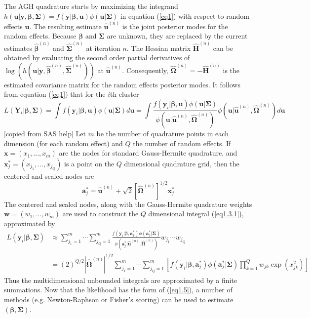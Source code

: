 	The AGH quadrature starts by maximizing the integrand $h(\bm u|\bm y, \bm \beta, \bm \Sigma)= f(\bm y|\bm \beta, \bm u)\phi(\bm u|\bm \Sigma)$ in equation (\ref{eq1}) with respect to random effects $\bm u$. The resulting estimate $\hat{\bm u}^{(n)}$ is the joint posterior modes for the random effects. Because $\bm \beta$ and $\bm \Sigma$ are unknown, they are replaced by the current estimates $\hat{\bm \beta}^{(n)}$ and $\hat{\bm \Sigma}^{(n)}$ at iteration $n$. The Hessian matrix $\hat{\bm H}^{(n)}$ can be obtained by evaluating the second order partial derivatives of $\log(h(\bm u|\bm y, \hat{\bm \beta}^{(n)}, \hat{\bm \Sigma}^{(n)}))$ at $\hat{\bm u}^{(n)}$.  Consequently, $\hat{\bm \Omega}^{(n)} =-\hat{\bm H}^{(n)} $ is the estimated covariance matrix for the random effects posterior modes. It follows from equation (\ref{eq1}) that for the $i$th cluster 
	\begin{equation}\label{eq1.3.1}
	L( \bm Y_i|\bm \beta, \bm \Sigma) = \int f(\bm y_i|\bm \beta, \bm u )\phi(\bm u|\bm\Sigma)d\bm u = 
	\int \frac{f(\bm y_i|\bm \beta, \bm u )\phi(\bm u|\bm\Sigma)}{\phi(\bm u|\hat{\bm u}^{(n)},\hat{\bm \Omega}^{(n)} )}\phi(\bm u|\hat{\bm u}^{(n)},\hat{\bm \Omega}^{(n)} )d\bm u
	\end{equation}
	[copied from SAS help] Let $m$ be the number of quadrature points in each dimension (for each random effect) and $Q$ the number of random effects. If $\bm x = (x_1, \ldots, x_m)$ are the nodes for standard Gauss-Hermite quadrature, and $\bm x^{\ast}_j=(x_{j_1}, \ldots, x_{j_Q}) $ is a point on the $Q$ dimensional quadrature grid, then the centered and scaled nodes are 
	\begin{equation}\label{1.3.2}
	\bm  a_j^{\ast} = \hat{\bm u}^{(n)} + \sqrt{2} [\hat{\bm \Omega}^{(n)} ]^{1/2}\bm x^{\ast}_j
	\end{equation}
	The centered and scaled nodes, along with the Gauss-Hermite quadrature weights $\bm w = (w_1, \ldots, w_m)$ are used to construct the $Q$ dimensional integral (\ref{eq1.3.1}), approximated by 
	\begin{equation}\label{eq1.5}
	\begin{aligned}
	L(\bm y_i|\bm\beta, \bm \Sigma) &\approx\sum_{j_1=1}^m\cdots \sum_{j_Q=1}^m\frac{f(\bm y_i|\bm \beta, \bm  a_j^{\ast})\phi(\bm  a_j^{\ast}|\bm\Sigma)}{\phi(\bm  a_j^{\ast}|\hat{\bm u}^{(n)},\hat{\bm \Omega}^{(n)} )}w_{j_1}\cdots w_{j_Q}\\
	& = (2)^{Q/2}|\hat{\bm \Omega}^{(n)}|^{1/2}\sum_{j_1=1}^m\cdots \sum_{j_Q=1}^m\left[ f(\bm y_i|\bm \beta, \bm  a_j^{\ast} )\phi(\bm  a_j^{\ast}|\bm\Sigma) \prod_{k=1}^Qw_{jk}\exp(x_{jk}^2)\right]
	\end{aligned}
	\end{equation}
	Thus the multidimensional unbounded integrals are approximated by a finite summations. Now that the likelihood has the form of (\ref{eq1.5}), a number of methods (e.g. Newton-Raphson or Fisher's scoring) can be used to estimate $(\bm \beta,  \bm \Sigma)$. 
	
